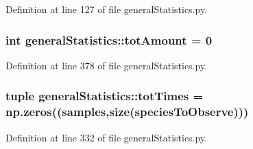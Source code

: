 \-Definition at line 127 of file general\-Statistics.\-py.

\hypertarget{namespacegeneral_statistics_a5d195c38bf488e92ee6250184c903b13}{
\subsubsection[{tot\-Amount}]{\setlength{\rightskip}{0pt plus 5cm}int {\bf general\-Statistics\-::tot\-Amount} = 0}}\label{namespacegeneral_statistics_a5d195c38bf488e92ee6250184c903b13}


\-Definition at line 378 of file general\-Statistics.\-py.

\hypertarget{namespacegeneral_statistics_a0478def357ccc1565f0e5749605a7f7f}{
\subsubsection[{tot\-Times}]{\setlength{\rightskip}{0pt plus 5cm}tuple {\bf general\-Statistics\-::tot\-Times} = np.\-zeros(({\bf samples},{\bf size}({\bf species\-To\-Observe})))}}\label{namespacegeneral_statistics_a0478def357ccc1565f0e5749605a7f7f}


\-Definition at line 332 of file general\-Statistics.\-py.

